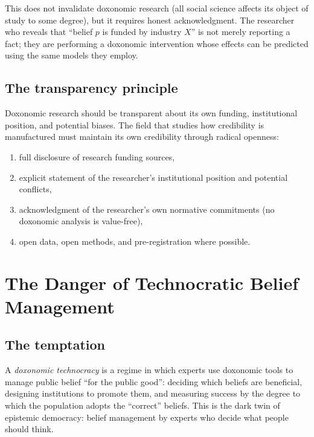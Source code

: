 This does not invalidate doxonomic research (all social science affects its object of study to some degree), but it requires honest acknowledgment.
The researcher who reveals that ``belief $p$ is funded by industry $X$'' is not merely reporting a fact; they are performing a doxonomic intervention whose effects can be predicted using the same models they employ.

\subsection{The transparency principle}

\begin{principle}
\label{prin:transparency}
Doxonomic research should be transparent about its own funding, institutional position, and potential biases.
The field that studies how credibility is manufactured must maintain its own credibility through radical openness:
\begin{enumerate}[nosep]
  \item full disclosure of research funding sources,
  \item explicit statement of the researcher's institutional position and potential conflicts,
  \item acknowledgment of the researcher's own normative commitments (no doxonomic analysis is value-free),
  \item open data, open methods, and pre-registration where possible.
\end{enumerate}
\end{principle}

\section{The Danger of Technocratic Belief Management}
\label{sec:ch34-technocracy}

\subsection{The temptation}

\begin{definition}
\label{def:doxonomic-technocracy}
A \emph{doxonomic technocracy} is a regime in which experts use doxonomic tools to manage public belief ``for the public good'': deciding which beliefs are beneficial, designing institutions to promote them, and measuring success by the degree to which the population adopts the ``correct'' beliefs.
This is the dark twin of epistemic democracy: belief management by experts who decide what people should think.
\end{definition}

